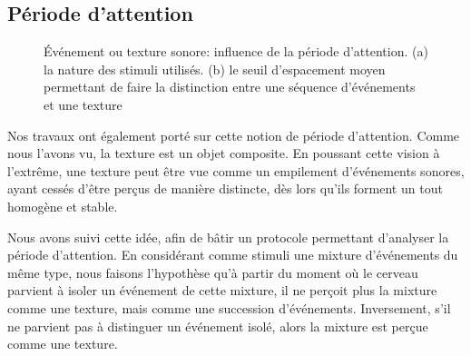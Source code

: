 \subsection{Période d'attention}

\begin{figure}[t]
        \myfloatalign
        \caption[Événement ou texture sonore: influence de la période d'attention]{Événement ou texture sonore: influence de la période d'attention. (a) la nature des stimuli utilisés. (b) le seuil d'espacement moyen permettant de faire la distinction entre une séquence d'événements et une texture}\label{fig:xptexture}
\end{figure}

Nos travaux ont également porté sur cette notion de période d'attention. Comme nous l'avons vu, la texture est un objet composite. En poussant cette vision à l’extrême, une texture peut être vue comme un empilement d’événements sonores, ayant cessés d'être perçus de manière distincte, dès lors qu'ils forment un tout homogène et stable. 

Nous avons suivi cette idée, afin de bâtir un protocole permettant d'analyser la période d'attention. En considérant comme stimuli une mixture d'événements du même type, nous faisons l'hypothèse qu'à partir du moment où le cerveau parvient à isoler un événement de cette mixture, il ne perçoit plus la mixture comme une texture, mais comme une succession d'événements. Inversement, s'il ne parvient pas à distinguer un événement isolé, alors la mixture est perçue comme une texture.

